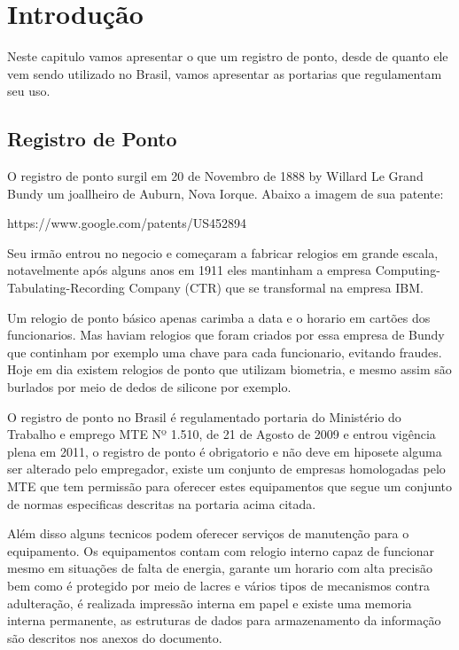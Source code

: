 \documentclass[12pt,openright,twoside,a4paper,english, brazil]{abntex2} %
\begin{document}
\listoffigures*
\cleardoublepage %
\listoftables* %
\cleardoublepage
\printterms[columns=1,style=align] %
\cleardoublepage %
\tableofcontents








\chapter{Introdução}


Neste capitulo vamos apresentar o que um registro de ponto, desde de quanto ele vem sendo utilizado no Brasil, vamos apresentar as portarias que regulamentam seu uso.

\section{Registro de Ponto}

O registro de ponto surgil em 20 de Novembro de 1888 by Willard Le Grand Bundy um joallheiro de Auburn, Nova Iorque. Abaixo a imagem de sua patente:

https://www.google.com/patents/US452894

Seu irmão entrou no negocio e começaram a fabricar relogios em grande escala, notavelmente após alguns anos em 1911 eles mantinham a empresa Computing-Tabulating-Recording Company (CTR) que se transformal na empresa IBM.

Um relogio de ponto básico apenas carimba a data e o horario em cartões dos funcionarios. Mas haviam relogios que foram criados por essa empresa de Bundy que continham por exemplo uma chave para cada funcionario, evitando fraudes. Hoje em dia existem relogios de ponto que utilizam biometria, e mesmo assim são burlados por meio de dedos de silicone por exemplo.

O registro de ponto no Brasil é regulamentado portaria do Ministério do Trabalho e emprego MTE Nº 1.510, de 21 de Agosto de 2009 e entrou vigência plena em 2011, o registro de ponto é obrigatorio e não deve em hiposete alguma ser alterado pelo empregador, existe um conjunto de empresas homologadas pelo MTE que tem permissão para oferecer estes equipamentos que segue um conjunto de normas especificas descritas na portaria acima citada.

Além disso alguns tecnicos podem oferecer serviços de manutenção para o equipamento. Os equipamentos contam com relogio interno capaz de funcionar mesmo em situações de falta de energia, garante um horario com alta precisão bem como é protegido por meio de lacres e vários tipos de mecanismos contra adulteração, é realizada impressão interna em papel e existe uma memoria interna permanente, as estruturas de dados para armazenamento da informação são descritos nos anexos do documento.
\end{document}
